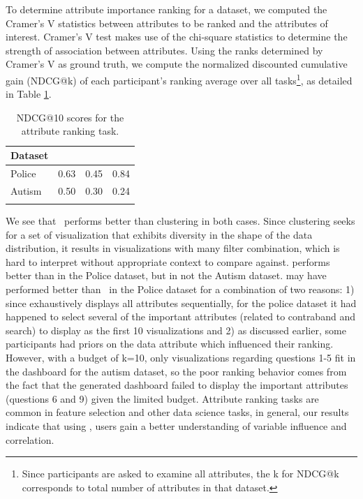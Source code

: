 To determine attribute importance ranking for a dataset, we computed the Cramer's V statistics between attributes to be ranked and the attributes of interest. Cramer's V test makes use of the chi-square statistics to determine the strength of association between attributes. Using the ranks determined by Cramer's V as ground truth, we compute the normalized discounted cumulative gain (NDCG@k) of each participant's ranking average over all tasks\footnote{Since participants are asked to examine all attributes, the k for NDCG@k corresponds to total number of attributes in that dataset.}, as detailed in Table \ref{table:ndcg_ranking_result}.
\begin{table}[ht!]
	\centering
	\begin{tabular}{lrrr}
	\hline
	 Dataset   &   \system &   \cluster &   \BFS \\
	\hline
	 Police    &      0.63 &      0.45 &  0.84 \\
	 Autism    &      0.50 &      0.30 &  0.24 \\
	\hline
	\label{table:ndcg_ranking_result}
	\end{tabular}
	\caption{NDCG@10 scores for the attribute ranking task.}
	\vspace{-10pt}
\end{table}
We see that \system\ performs better than clustering in both cases. Since clustering seeks for a set of visualization that exhibits diversity in the shape of the data distribution, it results in visualizations with many filter combination, which is hard to interpret without appropriate context to compare against. \BFS performs better than \system in the Police dataset, but in not the Autism dataset. \BFS may have performed better than \system\ in the Police dataset for a combination of two reasons: 1) since \BFS exhaustively displays all attributes sequentially, for the police dataset it had happened to select several of the important attributes (related to contraband and search) to display as the first 10 visualizations and 2) as discussed earlier, some participants had priors on the data attribute which influenced their ranking. However, with a budget of k=10, only visualizations regarding questions 1-5 fit in the dashboard for the autism dataset, so the poor ranking behavior comes from the fact that the \BFS generated dashboard failed to display the important attributes (questions 6 and 9) given the limited budget.
\npar Attribute ranking tasks are common in feature selection and other data science tasks, in general, our results indicate that using \system, users gain a better understanding of variable influence and correlation.

